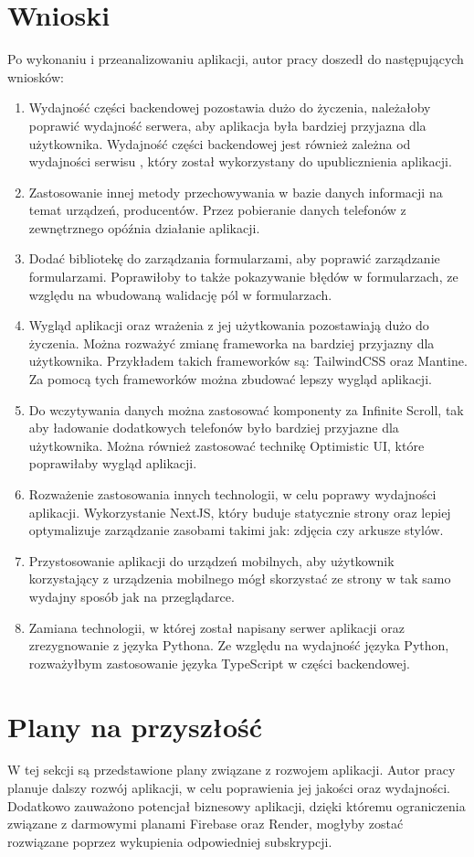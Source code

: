 \section{Wnioski}
Po wykonaniu i przeanalizowaniu aplikacji, autor pracy doszedł do następujących wniosków:
\begin{enumerate}
  \item Wydajność części backendowej pozostawia dużo do życzenia, należałoby poprawić wydajność serwera, aby aplikacja była bardziej przyjazna dla użytkownika. Wydajność części backendowej jest również zależna od wydajności serwisu \cite{render}, który został wykorzystany do upublicznienia aplikacji.
  \item Zastosowanie innej metody przechowywania w bazie danych informacji na temat urządzeń, producentów. Przez pobieranie danych telefonów z zewnętrznego opóźnia działanie aplikacji.
  \item Dodać bibliotekę do zarządzania formularzami, aby poprawić zarządzanie formularzami. Poprawiłoby to także pokazywanie błędów w formularzach, ze względu na wbudowaną walidację pól w formularzach.
  \item Wygląd aplikacji oraz wrażenia z jej użytkowania pozostawiają dużo do życzenia. Można rozważyć zmianę frameworka na bardziej przyjazny dla użytkownika. Przykładem takich frameworków są: TailwindCSS oraz Mantine. Za pomocą tych frameworków można zbudować lepszy wygląd aplikacji.
  \item Do wczytywania danych można zastosować komponenty za Infinite Scroll, tak aby ładowanie dodatkowych telefonów było bardziej przyjazne dla użytkownika. Można również zastosować technikę Optimistic UI, które poprawiłaby wygląd aplikacji.
  \item Rozważenie zastosowania innych technologii, w celu poprawy wydajności aplikacji. Wykorzystanie NextJS, który buduje statycznie strony oraz lepiej optymalizuje zarządzanie zasobami takimi jak: zdjęcia czy arkusze stylów.
  \item Przystosowanie aplikacji do urządzeń mobilnych, aby użytkownik korzystający z urządzenia mobilnego mógł skorzystać ze strony w tak samo wydajny sposób jak na przeglądarce.
  \item Zamiana technologii, w której został napisany serwer aplikacji oraz zrezygnowanie z języka Pythona. Ze względu na wydajność języka Python, rozważyłbym zastosowanie języka TypeScript w części backendowej.
\end{enumerate}

\section{Plany na przyszłość}\label{future_plans}
W tej sekcji są przedstawione plany związane z rozwojem aplikacji. Autor pracy planuje dalszy rozwój aplikacji, w celu poprawienia jej jakości oraz wydajności. Dodatkowo zauważono potencjał biznesowy aplikacji, dzięki któremu ograniczenia związane z darmowymi planami Firebase oraz Render, mogłyby zostać rozwiązane poprzez wykupienia odpowiedniej subskrypcji.  

